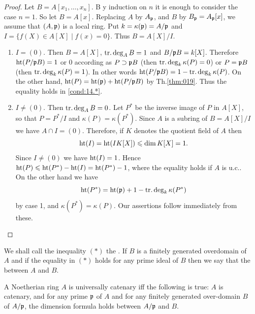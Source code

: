 \documentclass[../main]{subfiles}
\begin{document}
\begin{proof}
Let $B=A[x_1, \ldots, x_n]$. B y induction on $n$ it is enough to consider the case $n=1$. So let $B=A[x]$. Replacing $A$ by $A_{\mathfrak{p}}$, and $B$ by $B_{\mathfrak{p}}=A_{\mathfrak{p}}[x]$, we assume that $(A, \mathfrak{p})$ is a local ring. Put $k=\kappa(\mathfrak{p})=A / \mathfrak{p}$ and $I=\{f(X) \in A[X] \mid f(x)=0\}$. Thus $B=A[X]/I$.
\begin{enumerate}[label = Case \arabic*.]
    \item $I=(0)$. Then $B=A[X]$, $\operatorname{tr. deg}_AB=1$ and $B / \mathfrak{p}B=k[X]$. Therefore $\operatorname{ht}(P / \mathfrak{p}B)=1$ or $0$ according as $P \supset \mathfrak{p}B$ (then $\operatorname{tr. deg}_k\kappa(P)=0$) or $P=\mathfrak{p}B$ (then $\operatorname{tr. deg}_k\kappa(P)=1$). In other words $\operatorname{ht}(P/\mathfrak{p}B)=1-\operatorname{tr. deg}_k\kappa(P)$. On the other hand, $\operatorname{ht}(P)=\operatorname{ht}(\mathfrak{p})+\operatorname{ht}(P / \mathfrak{p} B)$ by Th.\ref{thm:019}. Thus the equality holds in \ref{cond:14.*}.
    \item $I \neq(0)$. Then $\operatorname{tr. deg}_AB=0$. Let $P^*$ be the inverse image of $P$ in $A[X]$, so that $P=P^*/I$ and $\kappa(P)=\kappa(P^*)$. Since $A$ is a subring of $B=A[X]/I$ we have $A \cap I=(0)$. Therefore, if $K$ denotes the quotient field of $A$ then \[\operatorname{ht}(I)=\operatorname{ht}(IK[X]) \leqslant \operatorname{dim} K[X]=1.\] Since $I \neq(0)$ we have $\operatorname{ht}(I)=1$. Hence $\operatorname{ht}(P) \leqslant \operatorname{ht}(P^*)-\operatorname{ht}(I)=\operatorname{ht}(P^*)-1$, where the equality holds if $A$ is u.c.. On the other hand we have \[\operatorname{ht}(P^*)=\operatorname{ht}(\mathfrak{p})+1-\operatorname{tr. deg}_k\kappa(P^*)\] by case 1, and $\kappa(P^*)=\kappa(P)$. Our assertions follow immediately from these.
\end{enumerate}
\end{proof}

\begin{definition}
We shall call the inequality $(*)$ the . If $B$ is a finitely generated overdomain of $A$ and if the equality in $(*)$ holds for any prime ideal of $B$ then we say that the  between $A$ and $B$.
\end{definition}

\begin{parcorollary}\label{cor:14.02}
A Noetherian ring $A$ is universally catenary iff the following is true: $A$ is catenary, and for any prime $\mathfrak{p}$ of $A$ and for any finitely generated over-domain $B$ of $A / \mathfrak{p}$, the dimension formula holds between $A / \mathfrak{p}$ and $B$.
\end{parcorollary} 
\end{document}
